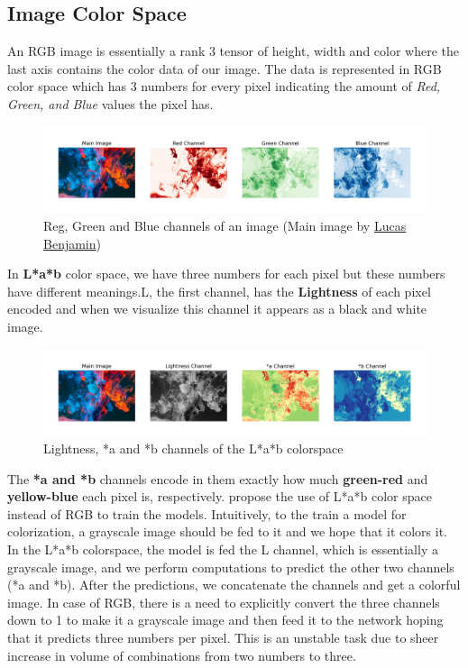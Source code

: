 \documentclass{article} %
\begin{document}
    \subsection{Image Color Space}
    \hspace*{0.25 in}An RGB image is essentially a rank 3 tensor of height, width and color where the last axis contains the color data of our image. The data is represented in RGB color space which has 3 numbers for every pixel indicating the amount of \textit{Red, Green, and Blue} values the pixel has.
    \begin{figure}[!htb]
    \begin{center}
    	\includegraphics[width=\textwidth]{figures/rgb_colorspace}
    	\caption{Reg, Green and Blue channels of an image (Main image by \href{https://unsplash.com/@aznbokchoy}{Lucas Benjamin})}
    	\label{rgb_colorspace}
    \end{center}
    \end{figure}
    In \textbf{L*a*b} color space, we have three numbers for each pixel but these numbers have different meanings.L, the first channel, has the \textbf{Lightness} of each pixel encoded and when we visualize this channel it appears as a black and white image. 
    \begin{figure}[!htb]
    \begin{center}
    	\includegraphics[width=\textwidth]{figures/Lab_colorspace}
    	\caption{Lightness, *a and *b channels of the L*a*b colorspace}
    	\label{lab_colorspace}
    \end{center}
    \end{figure}
    The \textbf{*a and *b} channels encode in them exactly how much \textbf{green-red} and \textbf{yellow-blue} each pixel is, respectively.
    \cite{guadarrama2017pixcolor,isola2018imagetoimage} propose the use of L*a*b color space instead of RGB to train the models. Intuitively, to the train a model for colorization, a grayscale image should be fed to it and we hope that it colors it. In the L*a*b colorspace, the model is fed the L channel, which is essentially a grayscale image, and we perform computations to predict the other two channels (*a and *b). After the predictions, we concatenate the channels and get a colorful image. In case of RGB, there is a need to explicitly convert the three channels down to 1 to make it a grayscale image and then feed it to the network hoping that it predicts three numbers per pixel. This is an unstable task due to sheer increase in volume of combinations from two numbers to three.
    
\end{document}
